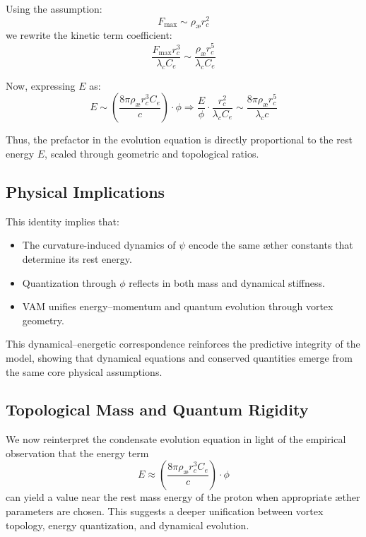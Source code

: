 Using the assumption:
\begin{equation}
F_{\max} \sim \rho_{\text{æ}} r_c^2
\end{equation}
we rewrite the kinetic term coefficient:
\begin{equation}
\frac{F_{\max} r_c^3}{\lambda_c C_e} \sim \frac{\rho_{\text{æ}} r_c^5}{\lambda_c C_e}
\end{equation}

Now, expressing $E$ as:
\begin{equation}
E \sim \left( \frac{8\pi \rho_{\text{æ}} r_c^3 C_e}{c} \right) \cdot \phi
\Rightarrow
\frac{E}{\phi} \cdot \frac{r_c^2}{\lambda_c C_e} \sim \frac{8\pi \rho_{\text{æ}} r_c^5}{\lambda_c c}
\end{equation}

Thus, the prefactor in the evolution equation is directly proportional to the rest energy $E$, scaled through geometric and topological ratios.

\subsection{Physical Implications}

This identity implies that:
\begin{itemize}
  \item The curvature-induced dynamics of $\psi$ encode the same æther constants that determine its rest energy.
  \item Quantization through $\phi$ reflects in both mass and dynamical stiffness.
  \item VAM unifies energy–momentum and quantum evolution through vortex geometry.
\end{itemize}

This dynamical–energetic correspondence reinforces the predictive integrity of the model, showing that dynamical equations and conserved quantities emerge from the same core physical assumptions.
\subsection{Topological Mass and Quantum Rigidity}

We now reinterpret the condensate evolution equation in light of the empirical observation that the energy term
\[
E \approx \left( \frac{8\pi \rho_{\text{æ}} r_c^3 C_e}{c} \right) \cdot \phi
\]
can yield a value near the rest mass energy of the proton when appropriate æther parameters are chosen. This suggests a deeper unification between vortex topology, energy quantization, and dynamical evolution.

